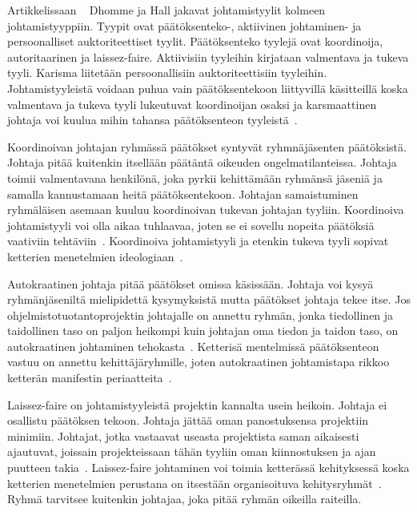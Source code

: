 \documentclass[finnish]{tktltiki2}
\theoremstyle{definition}
\theoremstyle{remark}
\begin{document}
Artikkelissaan ~\cite{Dhomne:2012:ITL:2382887.2382899} Dhomme ja Hall jakavat johtamistyylit kolmeen johtamistyyppiin. Tyypit ovat päätöksenteko-, aktiivinen johtaminen- ja persoonalliset auktoriteettiset tyylit. Päätöksenteko tyylejä ovat koordinoija, autoritaarinen ja laissez-faire. Aktiivisiin tyyleihin kirjataan valmentava ja tukeva tyyli. Karisma liitetään persoonallisiin auktoriteettisiin tyyleihin. Johtamistyyleistä voidaan puhua vain päätöksentekoon liittyvillä käsitteillä koska valmentava ja tukeva tyyli lukeutuvat koordinoijan osaksi ja karsmaattinen johtaja voi kuulua mihin tahansa päätöksenteon tyyleistä~\cite{Dhomne:2012:ITL:2382887.2382899}. 

Koordinoivan johtajan ryhmässä päätökset syntyvät ryhmnäjäsenten päätöksistä. Johtaja pitää kuitenkin itsellään päätäntä oikeuden ongelmatilanteissa. Johtaja toimii valmentavana henkilönä, joka pyrkii kehittämään ryhmänsä jäseniä ja samalla kannustamaan heitä päätöksentekoon. Johtajan samaistuminen ryhmäläisen asemaan kuuluu koordinoivan tukevan johtajan tyyliin. Koordinoiva johtamistyyli voi olla aikaa tuhlaavaa, joten se ei sovellu nopeita päätöksiä vaativiin tehtäviin~\cite{Dhomne:2012:ITL:2382887.2382899}. Koordinoiva johtamistyyli ja etenkin tukeva tyyli sopivat ketterien menetelmien ideologiaan~\cite{fowler2001agile}.

Autokraatinen johtaja pitää päätökset omissa käsissään. Johtaja voi kysyä ryhmänjäseniltä mielipidettä kysymyksistä mutta päätökset johtaja tekee itse. Jos ohjelmistotuotantoprojektin johtajalle on annettu ryhmän, jonka tiedollinen ja taidollinen taso on paljon heikompi kuin johtajan oma tiedon ja taidon taso, on autokraatinen johtaminen tehokasta~\cite{Dhomne:2012:ITL:2382887.2382899}. Ketterisä mentelmissä päätöksenteon vastuu on annettu kehittäjäryhmille, joten autokraatinen johtamistapa rikkoo ketterän manifestin periaatteita~\cite{fowler2001agile}.

Laissez-faire on johtamistyyleistä projektin kannalta usein heikoin. Johtaja ei osallistu päätöksen tekoon. Johtaja jättää oman panostuksensa projektiin minimiin. Johtajat, jotka vastaavat useasta projektista saman aikaisesti ajautuvat, joissain projekteissaan tähän tyyliin oman kiinnostuksen ja ajan puutteen takia~\cite{Dhomne:2012:ITL:2382887.2382899}. Laissez-faire johtaminen voi toimia ketterässä kehityksessä koska ketterien menetelmien perustana on itsestään organisoituva kehitysryhmät~\cite{fowler2001agile}. Ryhmä tarvitsee kuitenkin johtajaa, joka pitää ryhmän oikeilla raiteilla.
\end{document}

